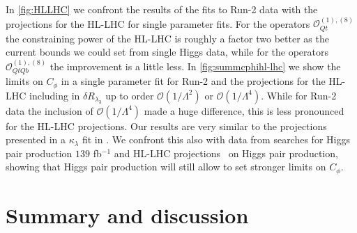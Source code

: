 In \autoref{fig:HLLHC} we confront the results of the fits to Run-2 data with the projections for the HL-LHC for single parameter fits. For the operators $\mathcal{O}_{Qt}^{(1),(8)}$ the constraining power of the HL-LHC is roughly a factor two better as the current bounds we could set from single Higgs data, while for the operators $\mathcal{O}_{QtQb}^{(1),(8)}$ the improvement is a little less.
In \autoref{fig:summcphihl-lhc} we show the limits on $C_{\phi}$ in a single parameter fit for Run-2 and the projections for the HL-LHC
including in $\delta R_{\lambda_3}$ up to order $\mathcal{O}(1/\Lambda^2)$ or $\mathcal{O}(1/\Lambda^4)$. While for Run-2 data the inclusion of $\mathcal{O}(1/\Lambda^4)$ made a huge difference, this is less pronounced for the HL-LHC projections. Our results are very similar to the projections presented in a $\kappa_{\lambda}$ fit in \cite{DiMicco:2019ngk}. 
We confront this also with data from searches for Higgs pair production $139$ fb$^{-1}$ \cite{ATLAS:2021jki}  and HL-LHC projections~\cite{CMS:2018ccd} on Higgs pair production, showing that Higgs pair production will still allow to set stronger limits on $C_{\phi}$. 


\section{Summary and discussion \label{sec:conc}}

